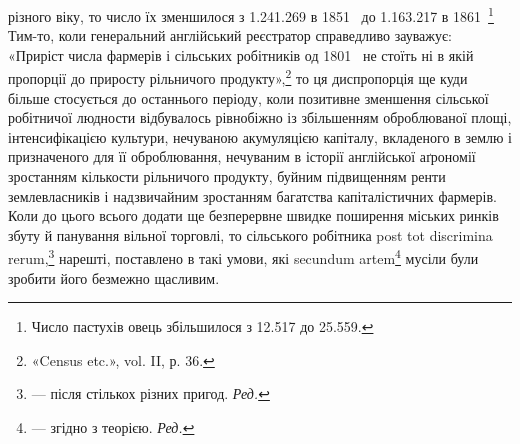 \parcont{}  %
різного віку, то число їх зменшилося з \num{1.241.269} в 1851~ до
\num{1.163.217} в 1861~\footnote{
Число пастухів овець збільшилося з \num{12.517} до \num{25.559}.
} Тим-то, коли генеральний англійський
реєстратор справедливо зауважує: «Приріст числа фармерів і
сільських робітників од 1801~ не стоїть ні в якій пропорції
до приросту рільничого продукту»,\footnote{
«Census etc.», vol. II, р. 36.
} то ця диспропорція ще
куди більше стосується до останнього періоду, коли позитивне
зменшення сільської робітничої людности відбувалось рівнобіжно
із збільшенням оброблюваної площі, інтенсифікацією культури,
нечуваною акумуляцією капіталу, вкладеного в землю і призначеного
для її оброблювання, нечуваним в історії англійської
аґрономії зростанням кількости рільничого продукту, буйним
підвищенням ренти землевласників і надзвичайним зростанням
багатства капіталістичних фармерів. Коли до цього всього додати
ще безперервне швидке поширення міських ринків збуту й
панування вільної торговлі, то сільського робітника post tot
discrimina rerum,\footnote*{
— після стількох різних пригод. \emph{Ред.}
} нарешті, поставлено в такі умови, які secundum
artem\footnote*{
— згідно з теорією. \emph{Ред.}
} мусіли були зробити його безмежно щасливим.

